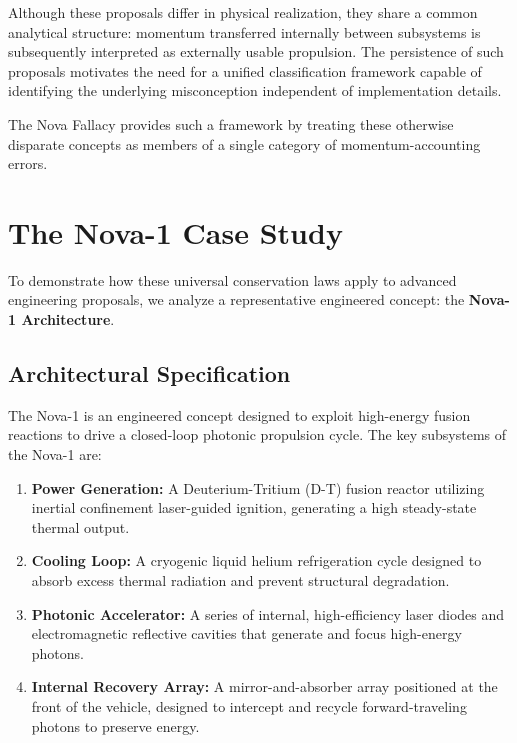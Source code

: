 \documentclass[journal,10pt,twoside]{IEEEtran}
\begin{document}
Although these proposals differ in physical realization, they share a common analytical structure: momentum transferred internally between subsystems is subsequently interpreted as externally usable propulsion. The persistence of such proposals motivates the need for a unified classification framework capable of identifying the underlying misconception independent of implementation details.

The Nova Fallacy provides such a framework by treating these otherwise disparate concepts as members of a single category of momentum-accounting errors.

\section{The Nova-1 Case Study}
\label{sec:nova_case}

To demonstrate how these universal conservation laws apply to advanced engineering proposals, we analyze a representative engineered concept: the \textbf{Nova-1 Architecture}.

\subsection{Architectural Specification}
The Nova-1 is an engineered concept designed to exploit high-energy fusion reactions to drive a closed-loop photonic propulsion cycle. The key subsystems of the Nova-1 are:
\begin{enumerate}
    \item \textbf{Power Generation:} A Deuterium-Tritium (D-T) fusion reactor utilizing inertial confinement laser-guided ignition, generating a high steady-state thermal output.
    \item \textbf{Cooling Loop:} A cryogenic liquid helium refrigeration cycle designed to absorb excess thermal radiation and prevent structural degradation.
    \item \textbf{Photonic Accelerator:} A series of internal, high-efficiency laser diodes and electromagnetic reflective cavities that generate and focus high-energy photons.
    \item \textbf{Internal Recovery Array:} A mirror-and-absorber array positioned at the front of the vehicle, designed to intercept and recycle forward-traveling photons to preserve energy.
\end{enumerate}
\end{document}
